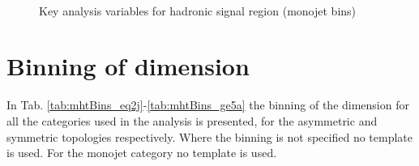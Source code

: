 \begin{figure}
\begin{center}
         ~~
         \\
        \caption{Key analysis variables for hadronic signal region (monojet bins)}
        \label{fig:distribution_signal_mono}
    \end{center}
\end{figure}

\clearpage
\section{Binning of \MHT dimension}
\label{app:mhtBinning} 
In Tab. \ref{tab:mhtBins_eq2j}-\ref{tab:mhtBins_ge5a} the binning of
the \mht dimension for all the categories used in the analysis is
presented, for the asymmetric and symmetric topologies respectively.
Where the binning is not specified no template is used.  For the
monojet category no template is used. 


